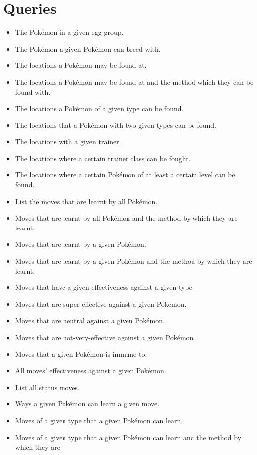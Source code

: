 \documentclass{article}
\begin{document}
\section{Queries}
\begin{itemize}
    \item The Pok\'emon in a given egg group.
    \item The Pok\'emon a given Pok\'emon can breed with.
    \item The locations a Pok\'emon may be found at.
    \item The locations a Pok\'emon may be found at and the method which they can be found with.
    \item The locations a Pok\'emon of a given type can be found.
    \item The locations that a Pok\'emon with two given types can be found.
    \item The locations with a given trainer.
    \item The locations where a certain trainer class can be fought.
    \item The locations where a certain Pok\'emon of at least a certain level can be found.
    \item List the moves that are learnt by all Pok\'emon.
    \item Moves that are learnt by all Pok\'emon and the method by which they are learnt.
    \item Moves that are learnt by a given Pok\'emon.
    \item Moves that are learnt by a given Pok\'emon and the method by which they are learnt.
    \item Moves that have a given effectiveness against a given type.
    \item Moves that are super-effective against a given Pok\'emon.
    \item Moves that are neutral against a given Pok\'emon.
    \item Moves that are not-very-effective against a given Pok\'emon.
    \item Moves that a given Pok\'emon is immune to.
    \item All moves' effectiveness against a given Pok\'emon.
    \item List all status moves.
    \item Ways a given Pok\'emon can learn a given move.
    \item  Moves of a given type that a given Pok\'emon can learn.
    \item Moves of a given type that a given Pok\'emon can learn and the method by which they are

\end{itemize}
\end{document}
